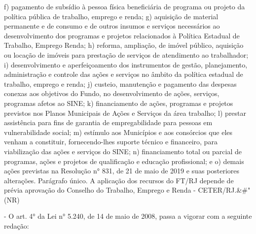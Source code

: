 \documentclass[10pt]{article}
\begin{document}
f)	pagamento de subsídio à pessoa física beneficiária de programa ou projeto da política pública de trabalho, emprego e renda;
g)	aquisição de material permanente e de consumo e de outros insumos e serviços necessários ao desenvolvimento dos programas e projetos relacionados à Política Estadual de Trabalho, Emprego Renda;
h)	reforma, ampliação, de imóvel público, aquisição ou locação de imóveis para prestação de serviços de atendimento ao trabalhador;
i)	desenvolvimento e aperfeiçoamento dos instrumentos de gestão, planejamento, administração e controle das ações e serviços no âmbito da política estadual de trabalho, emprego e renda;
j)	custeio, manutenção e pagamento das despesas conexas aos objetivos do Fundo, no desenvolvimento de ações, serviços, programas afetos ao SINE;
k)	financiamento de ações, programas e projetos previstos nos Planos Municipais de Ações e Serviços da área trabalho;
l)	prestar assistência para fins de garantia de empregabilidade para pessoas em vulnerabilidade social;
m)	estímulo aos Municípios e aos consórcios que eles venham a constituir, fornecendo-lhes suporte técnico e financeiro, para viabilização das ações e serviços do SINE;
n)	financiamento total ou parcial de programas, ações e projetos de qualificação e educação profissional; e 
o)	demais ações previstas na Resolução n° 831, de 21 de maio de 2019 e suas posteriores alterações.
Parágrafo único. A aplicação dos recursos do FT/RJ depende de prévia aprovação do Conselho do Trabalho, Emprego e Renda - CETER/RJ.&#" (NR)





\item - O art. 4° da Lei n° 5.240, de 14 de maio de 2008, passa a vigorar com a seguinte redação:
\end{document}
